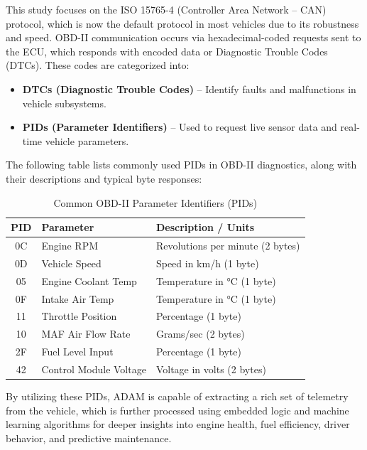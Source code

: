 This study focuses on the ISO 15765-4 (Controller Area Network – CAN) protocol, which is now the default protocol in most vehicles due to its robustness and speed. OBD-II communication occurs via hexadecimal-coded requests sent to the ECU, which responds with encoded data or Diagnostic Trouble Codes (DTCs). These codes are categorized into:

\begin{itemize}
    \item \textbf{DTCs (Diagnostic Trouble Codes)} – Identify faults and malfunctions in vehicle subsystems.
    \item \textbf{PIDs (Parameter Identifiers)} – Used to request live sensor data and real-time vehicle parameters.
\end{itemize}

The following table lists commonly used PIDs in OBD-II diagnostics, along with their descriptions and typical byte responses:

\begin{table}[h]
\centering
\caption{Common OBD-II Parameter Identifiers (PIDs)}
\begin{tabular}{|c|l|l|}
\hline
\textbf{PID} & \textbf{Parameter} & \textbf{Description / Units} \\
\hline
0C & Engine RPM & Revolutions per minute (2 bytes) \\
0D & Vehicle Speed & Speed in km/h (1 byte) \\
05 & Engine Coolant Temp & Temperature in °C (1 byte) \\
0F & Intake Air Temp & Temperature in °C (1 byte) \\
11 & Throttle Position & Percentage (1 byte) \\
10 & MAF Air Flow Rate & Grams/sec (2 bytes) \\
2F & Fuel Level Input & Percentage (1 byte) \\
42 & Control Module Voltage & Voltage in volts (2 bytes) \\
\hline
\end{tabular}
\label{tab:obd_pids}
\end{table}

By utilizing these PIDs, ADAM is capable of extracting a rich set of telemetry from the vehicle, which is further processed using embedded logic and machine learning algorithms for deeper insights into engine health, fuel efficiency, driver behavior, and predictive maintenance.



